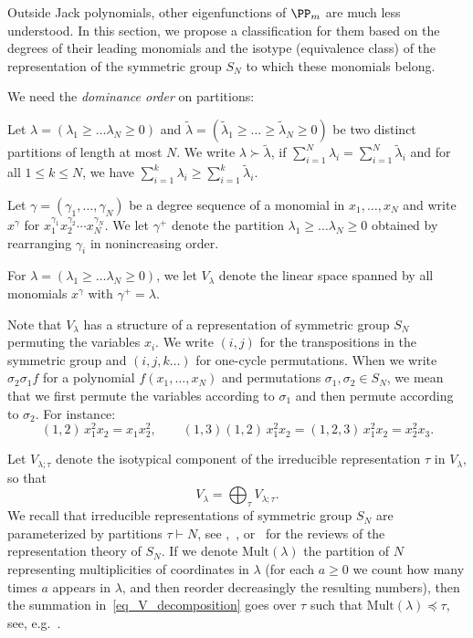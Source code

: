 \label{Section_classification}

Outside Jack polynomials, other eigenfunctions of $\PP_m$ are much less understood. In this section, we propose a classification for them based on the degrees of their leading monomials and the isotype (equivalence class) of the representation of the symmetric group $S_N$ to which these monomials belong.


We need the  \emph{dominance order} on partitions:
\begin{defi}
 Let $\lambda=(\lambda_1\ge\dots\lambda_N\ge 0)$ and $\tilde \lambda=(\tilde \lambda_1\ge \dots\ge \tilde \lambda_N\ge 0)$ be two distinct partitions of length at most $N$. We write $\lambda\succ \tilde \lambda$, if  $\sum_{i=1}^N\lambda_i = \sum_{i=1}^N \tilde \lambda_i$ and for
  all $1\le k \le N$, we have $\sum_{i=1}^k \lambda_i \ge \sum_{i=1}^k \tilde \lambda_i$.
\end{defi}

Let $\gamma=(\gamma_1,\dots,\gamma_N)$ be a degree sequence of a monomial in $x_1,\dots,x_N$ and write $x^{\gamma}$ for $x_1^{\gamma_1} x_2^{\gamma_2}\cdots x_N^{\gamma_N}$. We let $\gamma^+$ denote the partition $\lambda_1\ge\dots\lambda_N\ge 0$ obtained by rearranging $\gamma_i$ in nonincreasing order.

\begin{defi} \label{Definition_V_lambda}
 For $\lambda=(\lambda_1\ge\dots\lambda_N\ge 0)$, we let $V_\lambda$ denote the linear space spanned by all monomials $x^{\gamma}$ with $\gamma^+=\lambda$.
\end{defi}

Note that $V_\lambda$ has a structure of a representation of symmetric group $S_N$ permuting the variables $x_i$. We write $(i,j)$ for the transpositions in the symmetric group and $(i,j,k\dots)$ for one-cycle permutations. When we write $\sigma_2 \sigma_1 f$ for a polynomial $f(x_1,\dots,x_N)$ and permutations $\sigma_1,\sigma_2\in S_N$, we mean that we first permute the variables according to $\sigma_1$ and then permute according to $\sigma_2$. For instance:
$$
 (1,2)\, x_1^2 x_2 = x_1 x_2^2,\qquad (1,3) (1,2)\, x_1^2 x_2 = (1,2,3)\, x_1^2 x_2= x_2^2 x_3.
$$

Let $V_{\lambda;\tau}$ denote the isotypical component of the irreducible representation $\tau$ in $V_\lambda$, so that
\begin{equation}
\label{eq_V_decomposition}
 V_\lambda=\bigoplus_{\tau} V_{\lambda;\tau}.
\end{equation}
We recall that irreducible representations of symmetric group $S_N$ are parameterized by partitions $\tau\vdash N$, see \cite[Section I.7]{macdonald1998symmetric},~\cite{okounkov1996new}, or~\cite{james2006representation}  for the reviews of the representation theory of $S_N$. If we denote $\mathrm{Mult}(\lambda)$ the partition of $N$ representing multiplicities of coordinates in $\lambda$ (for each $a\ge 0$ we count how many times $a$ appears in $\lambda$, and then reorder decreasingly the resulting numbers), then the summation in~\eqref{eq_V_decomposition} goes over $\tau$ such that $\mathrm{Mult}(\lambda)\preceq \tau$, see, e.g.\ \cite[Remark on page 115]{macdonald1998symmetric}.


